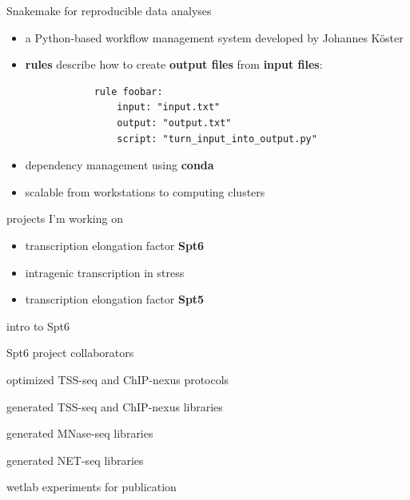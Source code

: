 \documentclass[aspectratio=169]{beamer}
\begin{document}
\begin{frame}[fragile]{Snakemake for reproducible data analyses}
    \begin{itemize}
        \item a Python-based workflow management system developed by Johannes Köster
        \item \textbf{rules} describe how to create \textbf{output files} from \textbf{input files}:
            \begin{lstlisting}
            rule foobar:
                input: "input.txt"
                output: "output.txt"
                script: "turn_input_into_output.py"
            \end{lstlisting}
        \item dependency management using \textbf{conda}
        \item scalable from workstations to computing clusters
    \end{itemize}
\end{frame}

\begin{frame}{projects I'm working on}
    \begin{itemize}[]
        \setlength{\itemsep}{1cm}
        \item transcription elongation factor \textbf{Spt6}
        \item intragenic transcription in stress
        \item transcription elongation factor \textbf{Spt5}
    \end{itemize}
\end{frame}

\begin{frame}{intro to Spt6}
\end{frame}

\begin{frame}{Spt6 project collaborators}
    \begin{description}[align=right, noitemsep]
        \item [Steve Doris] optimized TSS-seq and ChIP-nexus protocols
        \item [] generated TSS-seq and ChIP-nexus libraries
        \item [Olga Viktorovskaya] generated MNase-seq libraries
        \item [Magdalenda Murawska] generated NET-seq libraries
        \item [Dan Spatt] wetlab experiments for publication
    \end{description}
\end{frame}
\end{document}

